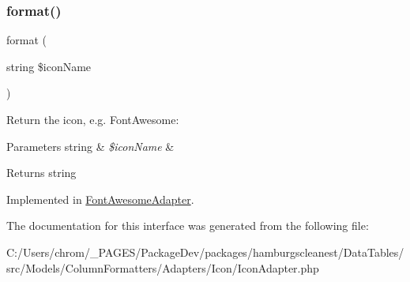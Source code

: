 \subsubsection{\texorpdfstring{format()}{format()}}
{\footnotesize\ttfamily format (\begin{DoxyParamCaption}\item[{string}]{\$icon\+Name }\end{DoxyParamCaption})}

Return the icon, e.\+g. Font\+Awesome\+: {\itshape }


\begin{DoxyParams}[1]{Parameters}
string & {\em \$icon\+Name} & \\
\hline
\end{DoxyParams}
\begin{DoxyReturn}{Returns}
string 
\end{DoxyReturn}


Implemented in \hyperlink{classhamburgscleanest_1_1_data_tables_1_1_models_1_1_column_formatters_1_1_adapters_1_1_icon_1_1_font_awesome_adapter_a1d0304fbc3ae752c85fdcea52a87fa03}{Font\+Awesome\+Adapter}.



The documentation for this interface was generated from the following file\+:\begin{DoxyCompactItemize}
\item 
C\+:/\+Users/chrom/\+\_\+\+P\+A\+G\+E\+S/\+Package\+Dev/packages/hamburgscleanest/\+Data\+Tables/src/\+Models/\+Column\+Formatters/\+Adapters/\+Icon/Icon\+Adapter.\+php\end{DoxyCompactItemize}
